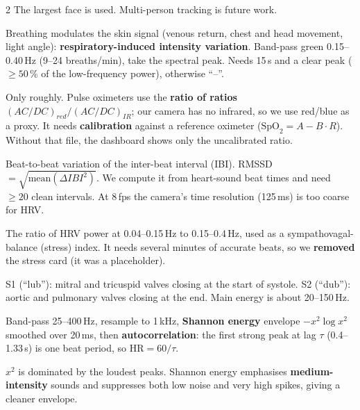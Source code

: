 \begin{multicols}{2}
{The largest face is used. Multi-person tracking is future work.}



{Breathing modulates the skin signal (venous return, chest and head movement, light angle): \textbf{respiratory-induced intensity
variation}. Band-pass green 0.15--0.40\,Hz (9--24 breaths/min), take the spectral peak. Needs 15\,s and a clear peak
($\geq 50\,\%$ of the low-frequency power), otherwise ``--''.}

{Only roughly. Pulse oximeters use the \textbf{ratio of ratios} $(AC/DC)_{red}/(AC/DC)_{IR}$; our camera has no infrared, so we
use red/blue as a proxy. It needs \textbf{calibration} against a reference oximeter ($\text{SpO}_2=A-B\cdot R$). Without that file,
the dashboard shows only the uncalibrated ratio.}

{Beat-to-beat variation of the inter-beat interval (IBI). RMSSD $=\sqrt{\text{mean}(\Delta IBI^2)}$. We compute it from heart-sound
beat times and need $\geq 20$ clean intervals. At 8\,fps the camera's time resolution (125\,ms) is too coarse for HRV.}

{The ratio of HRV power at 0.04--0.15\,Hz to 0.15--0.4\,Hz, used as a sympathovagal-balance (stress) index. It needs several
minutes of accurate beats, so we \textbf{removed} the stress card (it was a placeholder).}



{S1 (``lub''): mitral and tricuspid valves closing at the start of systole. S2 (``dub''): aortic and pulmonary valves closing at the
end. Main energy is about 20--150\,Hz.}

{Band-pass 25--400\,Hz, resample to 1\,kHz, \textbf{Shannon energy} envelope $-x^2\log x^2$ smoothed over 20\,ms, then
\textbf{autocorrelation}: the first strong peak at lag $\tau$ (0.4--1.33\,s) is one beat period, so $\text{HR}=60/\tau$.}

{$x^2$ is dominated by the loudest peaks. Shannon energy emphasises \textbf{medium-intensity} sounds and suppresses both low
noise and very high spikes, giving a cleaner envelope.}


\end{multicols}
